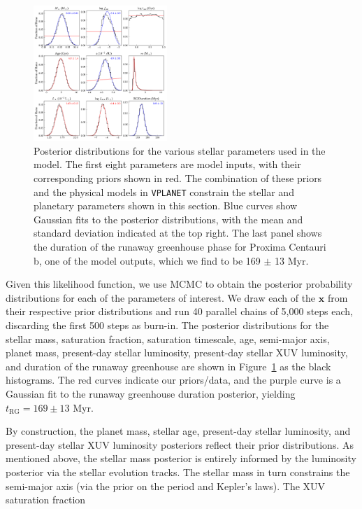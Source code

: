 \documentclass[]{emulateapj}
\begin{document}
\begin{figure}[hbt]
  \begin{center}
      \includegraphics[width=0.45\textwidth]{figures/star_posteriors.pdf}
       \caption{Posterior distributions for the various stellar parameters used in the model. The first eight
                parameters are model inputs, with their corresponding priors shown in red. The combination of
                these priors and the physical models in \texttt{VPLANET} constrain the stellar and planetary
                parameters shown in this section. Blue curves show Gaussian fits to the posterior distributions,
                with the mean and standard deviation indicated at the top right.
                The last panel shows the duration of the runaway greenhouse
                phase for Proxima Centauri b, one of the model outputs, which we find to be 169 $\pm$ 13 Myr.}
     \label{fig:star_posteriors}
  \end{center}
\end{figure}

Given this likelihood function, we use MCMC to obtain the posterior probability distributions for each of the parameters
of interest. We draw each of the $\mathbf{x}$ from their respective prior distributions and run 40 parallel chains of 5,000 
steps each, discarding the first 500 steps as burn-in. The posterior distributions for the stellar mass, saturation fraction,
saturation timescale, age, semi-major axis, planet mass, present-day stellar luminosity, present-day stellar XUV luminosity, and 
duration of the runaway greenhouse are shown in Figure~\ref{fig:star_posteriors} as the black histograms. The red curves 
indicate our priors/data, and the purple curve is a Gaussian fit to the runaway greenhouse duration posterior,
yielding $t_\mathrm{RG} = 169 \pm 13$ Myr.

By construction, the planet mass, stellar age, present-day stellar luminosity, and present-day stellar XUV luminosity posteriors reflect
their prior distributions. As mentioned above, the stellar mass posterior is entirely informed by the luminosity posterior via the
\cite{YonseiYale13} stellar evolution tracks. The stellar mass in turn constrains the semi-major axis (via the prior on the period and
Kepler's laws). The XUV saturation fraction 
\end{document}
